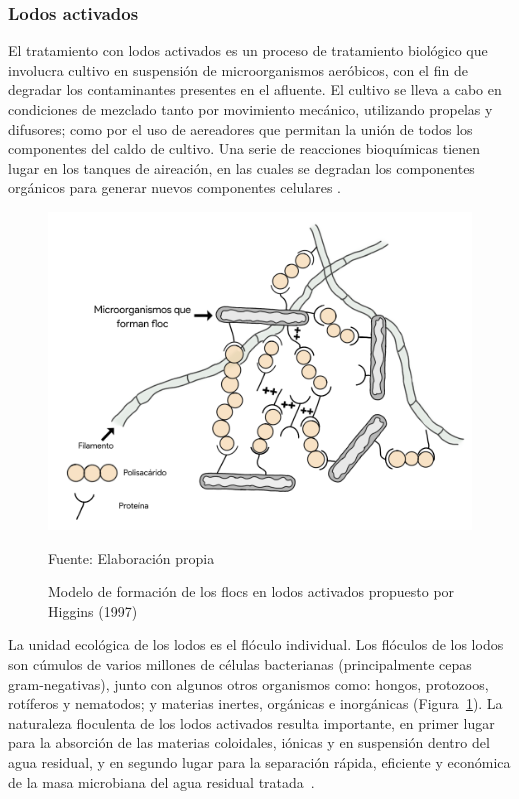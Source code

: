 \subsubsection*{Lodos activados}
El tratamiento con lodos activados es un proceso de tratamiento biológico que involucra cultivo en suspensión de microorganismos aeróbicos, con el fin de degradar los contaminantes presentes en el afluente. El cultivo se lleva a cabo en condiciones de mezclado tanto por movimiento mecánico, utilizando propelas y difusores; como por el uso de aereadores que permitan la unión de todos los componentes del caldo de cultivo. Una serie de reacciones bioquímicas tienen lugar en los tanques de aireación, en las cuales se degradan los componentes orgánicos para generar nuevos componentes celulares \emph{\citep{ashok16}}.\\
	\begin{figure}[!h]
		\centering
		\includegraphics[scale=0.15]{Floculo.png}
		\caption{Modelo de formación de los flocs en lodos activados propuesto por Higgins (1997)}
		\small{Fuente: Elaboración propia}
		\label{fig:modfloc}
	\end{figure}
La unidad ecológica de los lodos es el flóculo individual. Los flóculos de los lodos son cúmulos de varios millones de células bacterianas (principalmente cepas gram-negativas), junto con algunos otros organismos como: hongos, protozoos, rotíferos y nematodos; y materias inertes, orgánicas e inorgánicas (Figura~\ref{fig:modfloc}). La naturaleza floculenta de los lodos activados resulta importante, en primer lugar para la absorción de las materias coloidales, iónicas y en suspensión dentro del agua residual, y en segundo lugar para la separación rápida, eficiente y económica de la masa microbiana del agua residual tratada~\emph{\citep{ashok16}}.\\ 
